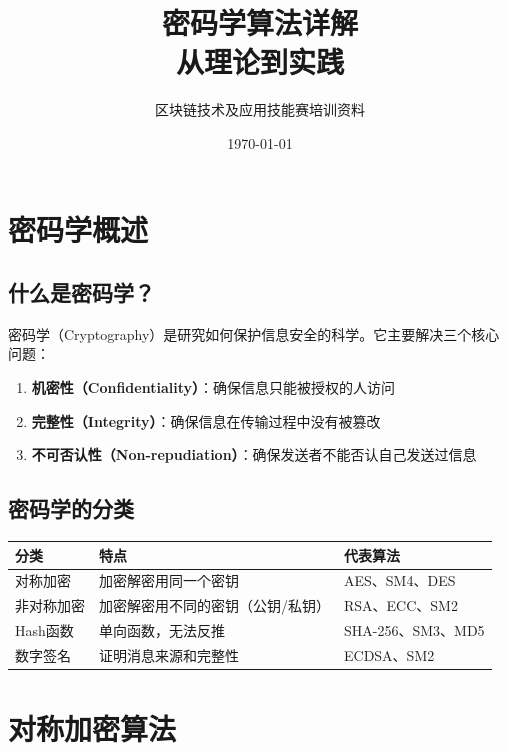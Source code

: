 \documentclass[12pt,a4paper]{article}
\title{\Huge\bfseries\color{PrimaryBlue} 密码学算法详解\\\Large 从理论到实践}
\author{区块链技术及应用技能赛培训资料}
\date{\today}
\begin{document}
\maketitle

\tableofcontents
\newpage

\section{密码学概述}

\subsection{什么是密码学？}

密码学（Cryptography）是研究如何保护信息安全的科学。它主要解决三个核心问题：

\begin{enumerate}[leftmargin=1.5em]
\item \textbf{机密性（Confidentiality）}：确保信息只能被授权的人访问
\item \textbf{完整性（Integrity）}：确保信息在传输过程中没有被篡改
\item \textbf{不可否认性（Non-repudiation）}：确保发送者不能否认自己发送过信息
\end{enumerate}

\subsection{密码学的分类}

\begin{center}
\begin{tabular}{|l|l|l|}
\hline
\textbf{分类} & \textbf{特点} & \textbf{代表算法} \\
\hline
对称加密 & 加密解密用同一个密钥 & AES、SM4、DES \\
\hline
非对称加密 & 加密解密用不同的密钥（公钥/私钥） & RSA、ECC、SM2 \\
\hline
Hash函数 & 单向函数，无法反推 & SHA-256、SM3、MD5 \\
\hline
数字签名 & 证明消息来源和完整性 & ECDSA、SM2 \\
\hline
\end{tabular}
\end{center}

\section{对称加密算法}
\end{document}

